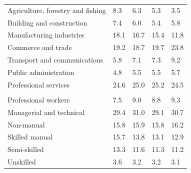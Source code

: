 \documentclass{article}
\begin{document}
\begin{table}[h]
\begin{tabular}{KTTTT}
    \hline
Agriculture, forestry and fishing  & 8.3& 6.3& 5.3& 3.5\\
Building and construction & 7.4& 6.0& 5.4& 5.8\\
Manufacturing industries & 18.1& 16.7& 15.4& 11.8\\
Commerce and trade  & 19.2& 18.7& 19.7& 23.8\\
Transport and communications  & 5.8& 7.1& 7.3& 9.2\\
Public administration & 4.8& 5.5& 5.5& 5.7\\
Professional services & 24.6& 25.0& 25.2& 24.5\\
\hline
    \\ 
    \hline
Professional workers  & 7.5& 9.0 & 8.8& 9.3\\
Managerial and technical & 29.4& 31.0& 29.1& 30.7\\
Non-manual & 15.8& 15.9& 15.8& 16.2\\
Skilled manual & 15.7& 13.8& 13.1& 12.9\\
Semi-skilled & 13.3& 11.6& 11.3& 11.2\\
Unskilled  & 3.6& 3.2& 3.2& 3.1\\
\end{tabular}
\end{table}
\pagebreak
\end{document}
